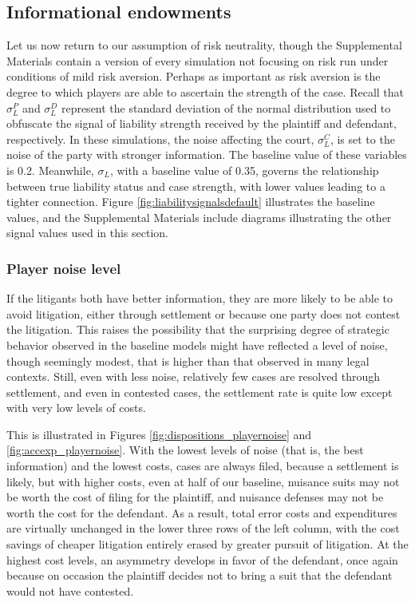 \documentclass{article}
\begin{document}
\subsection{Informational endowments}

Let us now return to our assumption of risk neutrality, though the Supplemental Materials contain a version of every simulation not focusing on risk run under conditions of mild risk aversion. Perhaps as important as risk aversion is the degree to which players are able to ascertain the strength of the case. Recall that $\sigma_{L}^P$ and $\sigma_{L}^D$ represent the standard deviation of the normal distribution used to obfuscate the signal of liability strength received by the plaintiff and defendant, respectively. In these simulations, the noise affecting the court, $\sigma_{L}^C$, is set to the noise of the party with stronger information. The baseline value of these variables is 0.2. Meanwhile, $\sigma_{L}$, with a baseline value of 0.35, governs the relationship between true liability status and case strength, with lower values leading to a tighter connection. Figure \ref{fig:liabilitysignalsdefault} illustrates the baseline values, and the Supplemental Materials include diagrams illustrating the other signal values used in this section.

\subsubsection{Player noise level}

If the litigants both have better information, they are more likely to be able to avoid litigation, either through settlement or because one party does not contest the litigation.  This raises the possibility that the surprising degree of strategic behavior observed in the baseline models might have reflected a level of noise, though seemingly modest, that is higher than that observed in many legal contexts. Still, even with less noise, relatively few cases are resolved through settlement, and even in contested cases, the settlement rate is quite low except with very low levels of costs. 

This is illustrated in Figures \ref{fig:dispositions_playernoise} and \ref{fig:accexp_playernoise}. With the lowest levels of noise (that is, the best information) and the lowest costs, cases are always filed, because a settlement is likely, but with higher costs, even at half of our baseline, nuisance suits may not be worth the cost of filing for the plaintiff, and nuisance defenses may not be worth the cost for the defendant. As a result, total error costs and expenditures are virtually unchanged in the lower three rows of the left column, with the cost savings of cheaper litigation entirely erased by greater pursuit of litigation. At the highest cost levels, an asymmetry develops in favor of the defendant, once again because on occasion the plaintiff decides not to bring a suit that the defendant would not have contested. 
\end{document}
